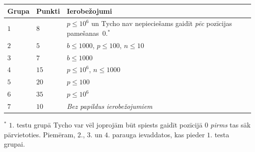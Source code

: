 \medskip
\begin{tabular}{lll}
  Grupa & Punkti & Ierobežojumi\\\hline
  $1$ & $8$  & $p\leq 10^6$ un Tycho nav nepieciešams gaidīt \emph{pēc} pozīcijas pamešanas~$0$.$^*$ \\ %
  $2$ & $5$  & $b\leq 1000$, $p\leq 100$, $n\leq 10$ \\
  $3$ & $7$  & $b\leq 1000$ \\
  $4$ & $15$ & $p\leq 10^6$, $n\leq 1000$\\
  $5$ & $20$ & $p\leq 100$\\
  $6$ & $35$ & $p\leq 10^6$\\
  $7$ & $10$ & \emph{Bez papildus ierobežojumiem}
\end{tabular}

\medskip
\noindent $^*$ $1.$ testu grupā Tycho var vēl joprojām būt spiests gaidīt pozīcijā $0$ \emph{pirms} tas sāk pārvietoties. Piemēram, $2.$, $3.$ un $4.$ parauga ievaddatos, kas pieder $1.$ testa grupai.
